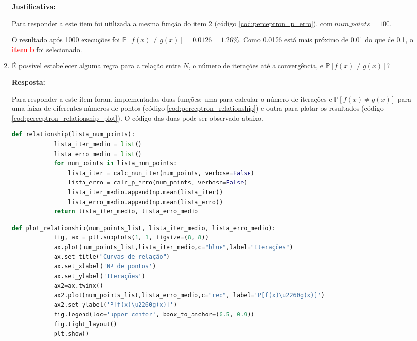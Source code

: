 \begin{enumerate}
    \par

    \textbf{Justificativa:}

    Para responder a este item foi utilizada a mesma função do item 2 (código \ref{cod:perceptron_p_erro}), com $num\_points = 100$.

    O resultado após 1000 execuções foi  $\mathbb{P}[f(x) \neq g(x)] = 0.0126 = 1.26\%$. Como 0.0126 está mais próximo de 0.01 do que de 0.1, o \textcolor{red}{\textbf{item b}} foi selecionado. 
     
    
    \item  É possível estabelecer alguma regra para a relação entre $N$, o número de iterações até a convergência,
    e $\mathbb{P}[f(x) \neq g(x)]$?

    \par

    \textbf{Resposta:}

    Para responder a este item foram implementadas duas funções: uma para calcular o número de iterações e $\mathbb{P}[f(x) \neq g(x)]$ para uma faixa de diferentes números de pontos (código \ref{cod:perceptron_relationship}) e outra para plotar os resultados (código \ref{cod:perceptron_relationship_plot}). O código das duas pode ser observado abaixo.


    \begin{lstlisting}[language=Python, caption=Cálculo da probabilidade de erro e do número de iterações, label=cod:perceptron_relationship]
        def relationship(lista_num_points):
            lista_iter_medio = list()
            lista_erro_medio = list()
            for num_points in lista_num_points:
                lista_iter = calc_num_iter(num_points, verbose=False)
                lista_erro = calc_p_erro(num_points, verbose=False)
                lista_iter_medio.append(np.mean(lista_iter))  
                lista_erro_medio.append(np.mean(lista_erro))
            return lista_iter_medio, lista_erro_medio
    \end{lstlisting}

    \begin{lstlisting}[language=Python, caption=Plot da probabilidade de erro e do número de iterações, label=cod:perceptron_relationship_plot]
        def plot_relationship(num_points_list, lista_iter_medio, lista_erro_medio):
            fig, ax = plt.subplots(1, 1, figsize=(8, 8))
            ax.plot(num_points_list,lista_iter_medio,c="blue",label="Iterações")
            ax.set_title("Curvas de relação")
            ax.set_xlabel('Nº de pontos')
            ax.set_ylabel('Iterações')
            ax2=ax.twinx()
            ax2.plot(num_points_list,lista_erro_medio,c="red", label='P[f(x)\u2260g(x)]')
            ax2.set_ylabel('P[f(x)\u2260g(x)]')
            fig.legend(loc='upper center', bbox_to_anchor=(0.5, 0.9))
            fig.tight_layout()
            plt.show()
    \end{lstlisting}


\end{enumerate}
